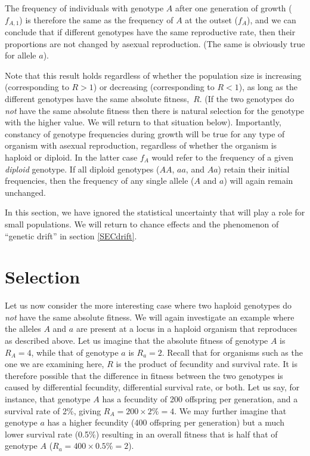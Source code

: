 \documentclass[11pt,a4paper]{book}
\newcommand{\e}{\emph}
\begin{document}
The frequency of individuals with genotype $A$ after one generation of growth ($f_{A,1}$) is therefore the same as the frequency of $A$ at the outset ($f_A$), and we can conclude that if different genotypes have the same reproductive rate, then their proportions are not changed by asexual reproduction. (The same is obviously true for allele $a$).

Note that this result holds regardless of whether the population size is increasing (corresponding to $R > 1$) or decreasing (corresponding to $R<1$), as long as the different genotypes have the same absolute fitness,~$R$. (If the two genotypes do \e{not} have the same absolute fitness then there is natural selection for the genotype with the higher value. We will return to that situation below).  Importantly, constancy of genotype frequencies during growth will be true for any type of organism with asexual reproduction, regardless of whether the organism is haploid or diploid. In the latter case $f_A$ would refer to the frequency of a given \e{diploid} genotype. If all diploid genotypes ($AA$, $aa$, and $Aa$) retain their initial frequencies, then the frequency of any single allele ($A$ and $a$) will again remain unchanged.

In this section, we have ignored the statistical uncertainty that will play a role for small populations. We will return to chance effects and the phenomenon of ``genetic drift'' in section \ref{SECdrift}.

\section{Selection \label{SECselection}}

Let us now consider the more interesting case where two haploid genotypes do \e{not} have the same absolute fitness. We will again investigate an example where the alleles $A$ and $a$ are present at a locus in a haploid organism that reproduces as described above. Let us imagine that the absolute fitness of genotype $A$ is $R_A=4$, while that of genotype $a$ is $R_a=2$. Recall that for organisms such as the one we are examining here, $R$ is the product of fecundity and survival rate. It is therefore possible that the difference in fitness between the two genotypes is caused by differential fecundity, differential survival rate, or both. Let us say, for instance, that genotype $A$ has a fecundity of 200 offspring per generation, and a survival rate of 2\%, giving $R_A=200\times 2\%=4$. We may further imagine that genotype $a$ has a higher fecundity (400 offspring per generation) but a much lower survival rate (0.5\%) resulting in an overall fitness that is half that of genotype $A$ ($R_a=400\times 0.5\%=2$). 
\end{document}
